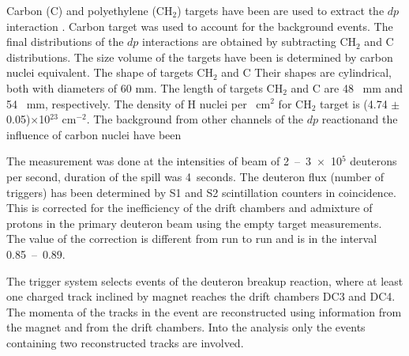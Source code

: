 \documentclass[twocolumn,epjc3]{svjour3}
\providecommand{\DIFaddtex}[1]{{\protect\color{Green} \sf #1}} %
\providecommand{\DIFdeltex}[1]{{\protect\color{Red} \scriptsize #1}} %
\providecommand{\DIFaddbegin}{} %
\providecommand{\DIFaddend}{} %
\providecommand{\DIFdelbegin}{} %
\providecommand{\DIFdelend}{} %
\providecommand{\DIFadd}[1]{\texorpdfstring{\DIFaddtex{#1}}{#1}} %
\providecommand{\DIFdel}[1]{\texorpdfstring{\DIFdeltex{#1}}{}} %
\newcommand{\DIFscaledelfig}{0.5}
\newlength{\DIFdelgraphicswidth} %
\newlength{\DIFdelgraphicsheight} %
\newcommand{\DIFaddincludegraphics}[2][]{{\color{blue}\fbox{\DIFOincludegraphics[#1]{#2}}}} %
\newcommand{\DIFdelincludegraphics}[2][]{%
\sbox{\DIFdelgraphicsbox}{\DIFOincludegraphics[#1]{#2}}%
\settoboxwidth{\DIFdelgraphicswidth}{\DIFdelgraphicsbox} %
\settoboxtotalheight{\DIFdelgraphicsheight}{\DIFdelgraphicsbox} %
\scalebox{\DIFscaledelfig}{%
\parbox[b]{\DIFdelgraphicswidth}{\usebox{\DIFdelgraphicsbox}\\[-\baselineskip] \rule{\DIFdelgraphicswidth}{0em}}\llap{\resizebox{\DIFdelgraphicswidth}{\DIFdelgraphicsheight}{%
\setlength{\unitlength}{\DIFdelgraphicswidth}%
\begin{picture}(1,1)%
\thicklines\linethickness{2pt} %
{\color[rgb]{1,0,0}\put(0,0){\framebox(1,1){}}}%
{\color[rgb]{1,0,0}\put(0,0){\line( 1,1){1}}}%
{\color[rgb]{1,0,0}\put(0,1){\line(1,-1){1}}}%
\end{picture}%
}\hspace*{3pt}}} %
} %
\DeclareRobustCommand{\DIFaddbegin}{\DIFOaddbegin \let\includegraphics\DIFaddincludegraphics} %
\DeclareRobustCommand{\DIFaddend}{\DIFOaddend \let\includegraphics\DIFOincludegraphics} %
\DeclareRobustCommand{\DIFdelbegin}{\DIFOdelbegin \let\includegraphics\DIFdelincludegraphics} %
\DeclareRobustCommand{\DIFdelend}{\DIFOaddend \let\includegraphics\DIFOincludegraphics} %
\begin{document}
Carbon (C) and polyethylene (CH$_2$) targets \DIFdelbegin \DIFdel{have been }\DIFdelend \DIFaddbegin \DIFadd{are }\DIFaddend used to extract the $dp$
interaction \DIFdelbegin \DIFdel{. Carbon target was used to account for the background events. The
final distributions of the $dp$ interactions are obtained }\DIFdelend by subtracting CH$_2$ and C distributions. The \DIFdelbegin \DIFdel{size }\DIFdelend \DIFaddbegin \DIFadd{volume }\DIFaddend of the targets
\DIFdelbegin \DIFdel{have been }\DIFdelend \DIFaddbegin \DIFadd{is }\DIFaddend determined by carbon nuclei equivalent. \DIFdelbegin \DIFdel{The shape of targets CH$_2$ and C }\DIFdelend \DIFaddbegin \DIFadd{Their shapes }\DIFaddend are cylindrical, both
with diameters of 60 mm. The length of targets CH$_2$ and C are 48\DIFaddbegin \DIFadd{~}\DIFaddend mm and 54\DIFaddbegin \DIFadd{~}\DIFaddend mm,
respectively. The density of H nuclei per\DIFaddbegin \DIFadd{~}\DIFaddend cm$^2$ for CH$_2$ target is (4.74
$\pm$ 0.05)$\times$10$^{23}$ cm$^{-2}$.
\DIFdelbegin \DIFdel{The background from other channels of the $dp$ reactionand the influence of carbon nuclei have been }\DIFdelend \DIFaddbegin 

\DIFadd{The measurement was done at the intensities of beam of 2~--~3~$\times$~10$^5$
deuterons per second, duration of the spill was 4~seconds. The deuteron flux
(number of triggers) has been determined by S1 and S2 scintillation counters in
coincidence. This is corrected for the inefficiency of the drift chambers and
admixture of protons in the primary deuteron beam using the empty target
measurements. The value of the correction is different from run to run and is in
the interval 0.85~--~0.89.
}

\DIFadd{The trigger system selects events of the deuteron breakup reaction, where at
least one charged track inclined by magnet reaches the drift chambers DC3 and
DC4. The momenta of the tracks in the event are reconstructed using information
from the magnet and from the drift chambers. Into the analy\-sis only the events
containing two reconstructed tracks are involved.
}
\end{document}
